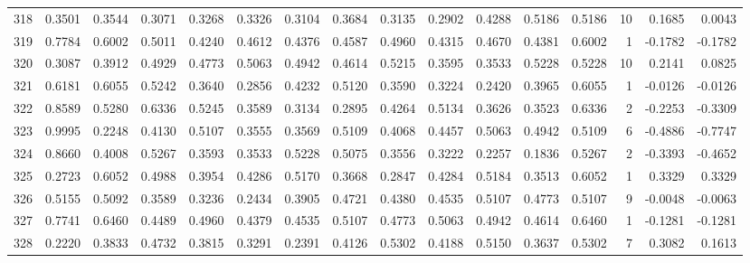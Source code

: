 \begin{tabular}{lrrrrrrrrrrrrrrr}
318 &      0.3501 &  0.3544 &  0.3071 &  0.3268 &  0.3326 &  0.3104 &  0.3684 &  0.3135 &  0.2902 &  0.4288 &   0.5186 &     0.5186 &     10 &                    0.1685 &                     0.0043 \\
319 &      0.7784 &  0.6002 &  0.5011 &  0.4240 &  0.4612 &  0.4376 &  0.4587 &  0.4960 &  0.4315 &  0.4670 &   0.4381 &     0.6002 &      1 &                   -0.1782 &                    -0.1782 \\
320 &      0.3087 &  0.3912 &  0.4929 &  0.4773 &  0.5063 &  0.4942 &  0.4614 &  0.5215 &  0.3595 &  0.3533 &   0.5228 &     0.5228 &     10 &                    0.2141 &                     0.0825 \\
321 &      0.6181 &  0.6055 &  0.5242 &  0.3640 &  0.2856 &  0.4232 &  0.5120 &  0.3590 &  0.3224 &  0.2420 &   0.3965 &     0.6055 &      1 &                   -0.0126 &                    -0.0126 \\
322 &      0.8589 &  0.5280 &  0.6336 &  0.5245 &  0.3589 &  0.3134 &  0.2895 &  0.4264 &  0.5134 &  0.3626 &   0.3523 &     0.6336 &      2 &                   -0.2253 &                    -0.3309 \\
323 &      0.9995 &  0.2248 &  0.4130 &  0.5107 &  0.3555 &  0.3569 &  0.5109 &  0.4068 &  0.4457 &  0.5063 &   0.4942 &     0.5109 &      6 &                   -0.4886 &                    -0.7747 \\
324 &      0.8660 &  0.4008 &  0.5267 &  0.3593 &  0.3533 &  0.5228 &  0.5075 &  0.3556 &  0.3222 &  0.2257 &   0.1836 &     0.5267 &      2 &                   -0.3393 &                    -0.4652 \\
325 &      0.2723 &  0.6052 &  0.4988 &  0.3954 &  0.4286 &  0.5170 &  0.3668 &  0.2847 &  0.4284 &  0.5184 &   0.3513 &     0.6052 &      1 &                    0.3329 &                     0.3329 \\
326 &      0.5155 &  0.5092 &  0.3589 &  0.3236 &  0.2434 &  0.3905 &  0.4721 &  0.4380 &  0.4535 &  0.5107 &   0.4773 &     0.5107 &      9 &                   -0.0048 &                    -0.0063 \\
327 &      0.7741 &  0.6460 &  0.4489 &  0.4960 &  0.4379 &  0.4535 &  0.5107 &  0.4773 &  0.5063 &  0.4942 &   0.4614 &     0.6460 &      1 &                   -0.1281 &                    -0.1281 \\
328 &      0.2220 &  0.3833 &  0.4732 &  0.3815 &  0.3291 &  0.2391 &  0.4126 &  0.5302 &  0.4188 &  0.5150 &   0.3637 &     0.5302 &      7 &                    0.3082 &                     0.1613 \\

\end{tabular}
